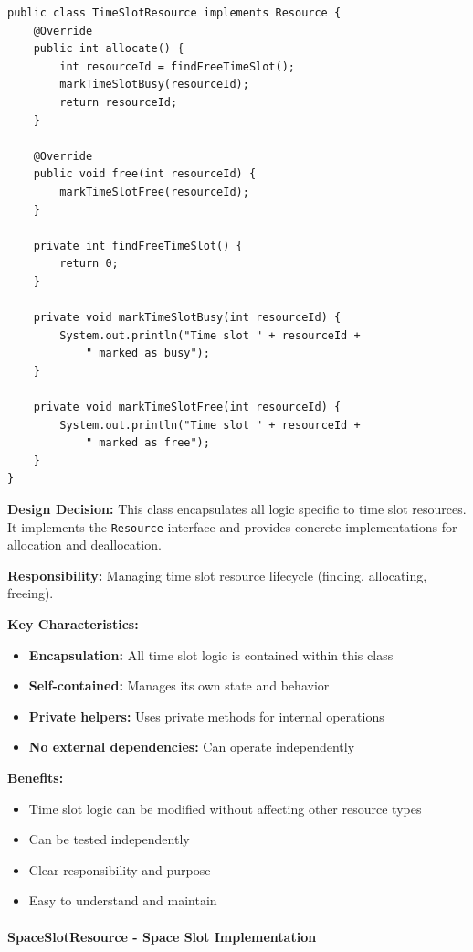 \begin{verbatim}
public class TimeSlotResource implements Resource {
    @Override
    public int allocate() {
        int resourceId = findFreeTimeSlot();
        markTimeSlotBusy(resourceId);
        return resourceId;
    }
    
    @Override
    public void free(int resourceId) {
        markTimeSlotFree(resourceId);
    }
    
    private int findFreeTimeSlot() {
        return 0;
    }
    
    private void markTimeSlotBusy(int resourceId) {
        System.out.println("Time slot " + resourceId + 
            " marked as busy");
    }
    
    private void markTimeSlotFree(int resourceId) {
        System.out.println("Time slot " + resourceId + 
            " marked as free");
    }
}
\end{verbatim}

\textbf{Design Decision:} This class encapsulates all logic specific to time slot resources. It implements the \texttt{Resource} interface and provides concrete implementations for allocation and deallocation.

\textbf{Responsibility:} Managing time slot resource lifecycle (finding, allocating, freeing).

\textbf{Key Characteristics:}
\begin{itemize}
    \item \textbf{Encapsulation:} All time slot logic is contained within this class
    \item \textbf{Self-contained:} Manages its own state and behavior
    \item \textbf{Private helpers:} Uses private methods for internal operations
    \item \textbf{No external dependencies:} Can operate independently
\end{itemize}

\textbf{Benefits:}
\begin{itemize}
    \item Time slot logic can be modified without affecting other resource types
    \item Can be tested independently
    \item Clear responsibility and purpose
    \item Easy to understand and maintain
\end{itemize}

\paragraph{SpaceSlotResource - Space Slot Implementation}

